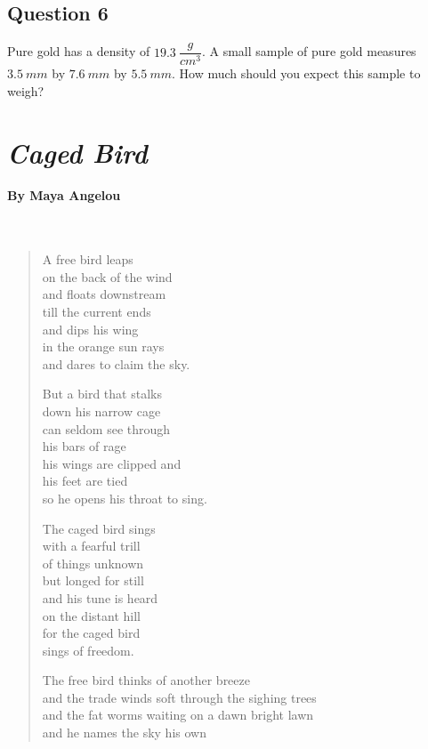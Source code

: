 \documentclass[11pt, letterpaper]{memoir}
\begin{document}
{	\subsection*{Question 6}
	Pure gold has a density of $19.3~\dfrac{g}{cm^3}$. A small sample of pure gold measures $3.5~mm$ by $7.6~mm$ by $5.5~mm$. How much should you expect this sample to weigh?
	
\newpage
\pagestyle{empty}
\addtocounter{page}{-1}
	\section*{\emph{Caged Bird}}
	\paragraph{By Maya Angelou}~
	\begin{verse}
		A free bird leaps\\
		on the back of the wind\\
		and floats downstream\\ 
		till the current ends\\
		and dips his wing\\
		in the orange sun rays\\
		and dares to claim the sky.
		
		But a bird that stalks\\
		down his narrow cage\\
		can seldom see through\\
		his bars of rage\\
		his wings are clipped and\\
		his feet are tied\\
		so he opens his throat to sing.
		
		The caged bird sings\\
		with a fearful trill\\ 
		of things unknown\\
		but longed for still\\
		and his tune is heard\\
		on the distant hill\\
		for the caged bird\\
		sings of freedom.
		
		The free bird thinks of another breeze\\
		and the trade winds soft through the sighing trees\\
		and the fat worms waiting on a dawn bright lawn\\
		and he names the sky his own
		

\end{verse}}
\end{document}
